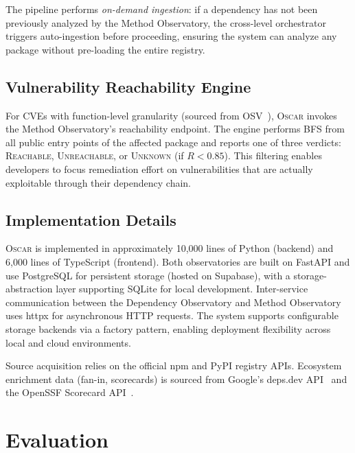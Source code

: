 \documentclass[conference]{IEEEtran}
\begin{document}
The pipeline performs \emph{on-demand ingestion}: if a dependency has not been previously analyzed by the Method Observatory, the cross-level orchestrator triggers auto-ingestion before proceeding, ensuring the system can analyze any package without pre-loading the entire registry.

\subsection{Vulnerability Reachability Engine}
\label{subsec:vuln-engine}

For CVEs with function-level granularity (sourced from OSV~\cite{osv}), \textsc{Oscar} invokes the Method Observatory's reachability endpoint. The engine performs BFS from all public entry points of the affected package and reports one of three verdicts: \textsc{Reachable}, \textsc{Unreachable}, or \textsc{Unknown} (if $R < 0.85$). This filtering enables developers to focus remediation effort on vulnerabilities that are actually exploitable through their dependency chain.

\subsection{Implementation Details}
\label{subsec:implementation}

\textsc{Oscar} is implemented in approximately 10,000 lines of Python (backend) and 6,000 lines of TypeScript (frontend). Both observatories are built on FastAPI and use PostgreSQL for persistent storage (hosted on Supabase), with a storage-abstraction layer supporting SQLite for local development. Inter-service communication between the Dependency Observatory and Method Observatory uses httpx for asynchronous HTTP requests. The system supports configurable storage backends via a factory pattern, enabling deployment flexibility across local and cloud environments.

Source acquisition relies on the official npm and PyPI registry APIs. Ecosystem enrichment data (fan-in, scorecards) is sourced from Google's deps.dev API~\cite{depsdev} and the OpenSSF Scorecard API~\cite{openssf}.

\section{Evaluation}
\label{sec:evaluation}
\end{document}
